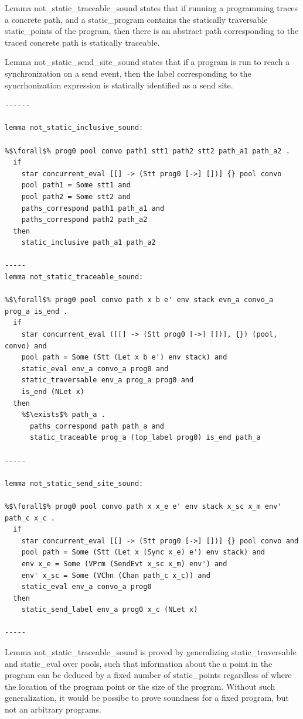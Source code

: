 \documentclass{article}
\begin{document}
Lemma not\_static\_traceable\_sound states that if running a programming traces a concrete
path, and a static\_program contains the statically traversable static\_points of the program, then there is an
abstract path corresponding to the traced concrete path is statically traceable.   

Lemma not\_static\_send\_site\_sound states that if a program is run to reach a synchronization on
a send event, then the label corresponding to the syncrhonization expression is statically
identified as a send site.

\begin{lstlisting}[language=logic, escapechar=\%]
------

lemma not_static_inclusive_sound:

%$\forall$% prog0 pool convo path1 stt1 path2 stt2 path_a1 path_a2 . 
  if
    star concurrent_eval [[] -> (Stt prog0 [->] [])] {} pool convo
    pool path1 = Some stt1 and 
    pool path2 = Some stt2 and 
    paths_correspond path1 path_a1 and 
    paths_correspond path2 path_a2
  then
    static_inclusive path_a1 path_a2

-----
lemma not_static_traceable_sound:

%$\forall$% prog0 pool convo path x b e' env stack evn_a convo_a prog_a is_end .
  if
    star concurrent_eval ([[] -> (Stt prog0 [->] [])], {}) (pool, convo) and 
    pool path = Some (Stt (Let x b e') env stack) and 
    static_eval env_a convo_a prog0 and 
    static_traversable env_a prog_a prog0 and 
    is_end (NLet x)
  then
    %$\exists$% path_a . 
      paths_correspond path path_a and 
      static_traceable prog_a (top_label prog0) is_end path_a

-----

lemma not_static_send_site_sound:

%$\forall$% prog0 pool convo path x x_e e' env stack x_sc x_m env' path_c x_c .
  if
    star concurrent_eval [[] -> (Stt prog0 [->] [])] {} pool convo and 
    pool path = Some (Stt (Let x (Sync x_e) e') env stack) and 
    env x_e = Some (VPrm (SendEvt x_sc x_m) env') and 
    env' x_sc = Some (VChn (Chan path_c x_c)) and 
    static_eval env_a convo_a prog0
  then 
    static_send_label env_a prog0 x_c (NLet x)

-----

\end{lstlisting}

Lemma not\_static\_traceable\_sound is proved by generalizing static\_traversable and static\_eval
over pools, such that information about the a point in the program can be deduced by a fixed
number of static\_points regardless of where the location of the program point or the size of the
program.  Without such generalization, it would be possibe to prove soundness for a fixed
program, but not an arbitrary programs.
\end{document}
